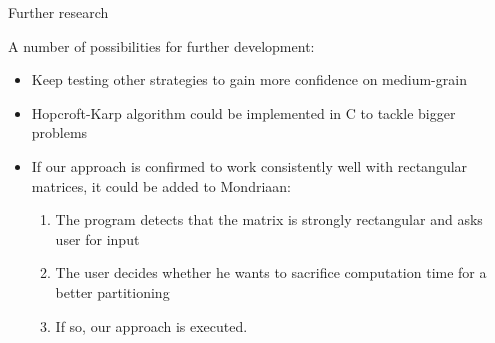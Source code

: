 \documentclass[10pt,serif]{beamer}
\begin{document}
\begin{frame}{Further research}

A number of possibilities for further development:

\begin{itemize}
	\item Keep testing other strategies to gain more confidence on medium-grain
	\item Hopcroft-Karp algorithm could be implemented in C to tackle bigger problems
	\item If our approach is confirmed to work consistently well with rectangular matrices, it could be added to Mondriaan:
		\begin{enumerate}
			\item The program detects that the matrix is strongly rectangular and asks user for input
			\item The user decides whether he wants to sacrifice computation time for a better partitioning
			\item If so, our approach is executed.
		\end{enumerate}
\end{itemize}
	
\end{frame}
\end{document}
